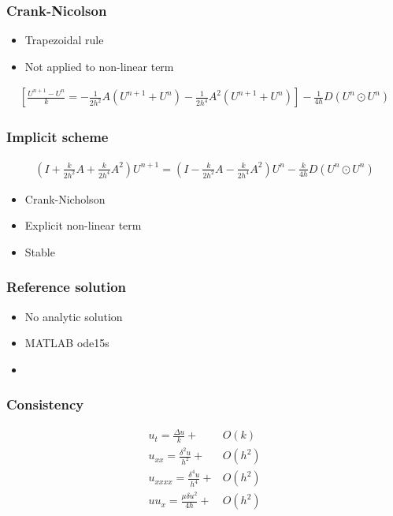 \documentclass[screen]{beamer}
\begin{document}
\begin{frame}
\frametitle{Crank-Nicolson}
\begin{itemize}
\normalsize
\item Trapezoidal rule
\item Not applied to non-linear term
\end{itemize}
\small
\begin{align*}
 \left[\frac{U^{n+1} - U^n}{k} =
- \frac{1}{2h^2}A(U^{n+1}+U^n) - \frac{1}{2h^4}A^2(U^{n+1}+U^n) \right] - \frac{1}{4h}D(U^{n}\odot U^n)
\end{align*}

\end{frame}


\begin{frame}
\frametitle{Implicit scheme}
\begin{align*}
(I + \frac{k}{2h^2}A + \frac{k}{2h^4}A^2)U^{n+1}
= (I - \frac{k}{2h^2}A - \frac{k}{2h^4}A^2)U^n - \frac{k}{4h}D(U^{n}\odot U^n)
\end{align*}

\begin{itemize}
\item Crank-Nicholson
\item Explicit non-linear term
\item Stable
\end{itemize}

\end{frame}


\begin{frame}
\frametitle{Reference solution}

\begin{itemize}
\item No analytic solution
\item MATLAB ode15s
\item 
\end{itemize}

\end{frame}


\begin{frame}
\frametitle{Consistency}
\begin{align*}
u_t= \frac{\Delta u}{k} + &O(k) \\
u_{xx} = \frac{\delta^2 u}{h^2} + &O(h^2) \\
u_{xxxx} = \frac{\delta^4 u}{h^4} + &O(h^2) \\
uu_{x} = \frac{\mu \delta u^2}{4h} + &O(h^2) \\
\end{align*}

\end{frame}
\end{document}
